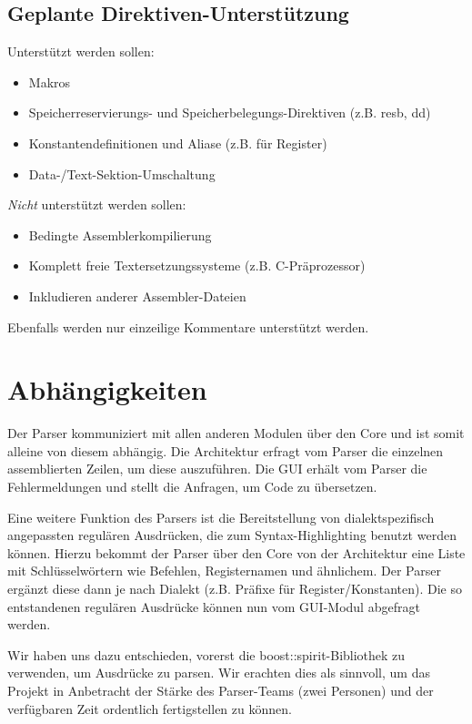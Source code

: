 \subsection{Geplante Direktiven-Unterstützung} Unterstützt werden sollen:

\begin{itemize}
\item Makros
\item Speicherreservierungs- und Speicherbelegungs-Direktiven (z.B. resb, dd)
\item Konstantendefinitionen und Aliase (z.B. für Register)
\item Data-/Text-Sektion-Umschaltung
\end{itemize}

\emph{Nicht} unterstützt werden sollen:

\begin{itemize}
\item Bedingte Assemblerkompilierung
\item Komplett freie Textersetzungssysteme (z.B. C-Präprozessor)
\item Inkludieren anderer Assembler-Dateien
\end{itemize} Ebenfalls werden nur einzeilige Kommentare unterstützt werden.

\section{Abhängigkeiten} Der Parser kommuniziert mit allen anderen Modulen
über den Core und ist somit alleine von diesem abhängig.  Die Architektur
erfragt vom Parser die einzelnen assemblierten Zeilen, um diese auszuführen.
Die GUI erhält vom Parser die Fehlermeldungen und stellt die Anfragen, um Code
zu übersetzen.

Eine weitere Funktion des Parsers ist die Bereitstellung von dialektspezifisch
angepassten regulären Ausdrücken, die zum Syntax-Highlighting benutzt werden
können.  Hierzu bekommt der Parser über den Core von der Architektur eine Liste
mit Schlüsselwörtern wie Befehlen, Registernamen und ähnlichem. Der Parser
ergänzt diese dann je nach Dialekt (z.B. Präfixe für Register/Konstanten).  Die
so entstandenen regulären Ausdrücke können nun vom GUI-Modul abgefragt werden.

Wir haben uns dazu entschieden, vorerst die boost::spirit-Bibliothek zu
verwenden, um Ausdrücke zu parsen.  Wir erachten dies als sinnvoll, um das
Projekt in Anbetracht der Stärke des Parser-Teams (zwei Personen) und der
verfügbaren Zeit ordentlich fertigstellen zu können.

